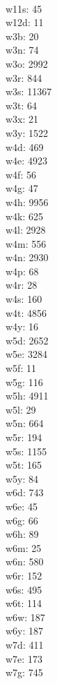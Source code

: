 \begin{multicols}{8}
  \\ w11s: 45
  \\ w12d: 11
  \\ w3b: 20
  \\ w3n: 74
  \\ w3o: 2992
  \\ w3r: 844
  \\ w3s: 11367
  \\ w3t: 64
  \\ w3x: 21
  \\ w3y: 1522
  \\ w4d: 469
  \\ w4e: 4923
  \\ w4f: 56
  \\ w4g: 47
  \\ w4h: 9956
  \\ w4k: 625
  \\ w4l: 2928
  \\ w4m: 556
  \\ w4n: 2930
  \\ w4p: 68
  \\ w4r: 28
  \\ w4s: 160
  \\ w4t: 4856
  \\ w4y: 16
  \\ w5d: 2652
  \\ w5e: 3284
  \\ w5f: 11
  \\ w5g: 116
  \\ w5h: 4911
  \\ w5l: 29
  \\ w5n: 664
  \\ w5r: 194
  \\ w5s: 1155
  \\ w5t: 165
  \\ w5y: 84
  \\ w6d: 743
  \\ w6e: 45
  \\ w6g: 66
  \\ w6h: 89
  \\ w6m: 25
  \\ w6n: 580
  \\ w6r: 152
  \\ w6s: 495
  \\ w6t: 114
  \\ w6w: 187
  \\ w6y: 187
  \\ w7d: 411
  \\ w7e: 173
  \\ w7g: 745

\end{multicols}
